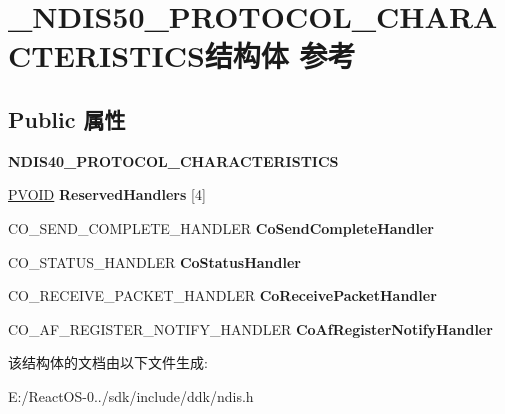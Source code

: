 \hypertarget{struct___n_d_i_s50___p_r_o_t_o_c_o_l___c_h_a_r_a_c_t_e_r_i_s_t_i_c_s}{}\section{\+\_\+\+N\+D\+I\+S50\+\_\+\+P\+R\+O\+T\+O\+C\+O\+L\+\_\+\+C\+H\+A\+R\+A\+C\+T\+E\+R\+I\+S\+T\+I\+C\+S结构体 参考}
\label{struct___n_d_i_s50___p_r_o_t_o_c_o_l___c_h_a_r_a_c_t_e_r_i_s_t_i_c_s}
\subsection*{Public 属性}
\begin{DoxyCompactItemize}
\item 
\mbox{\label{struct___n_d_i_s50___p_r_o_t_o_c_o_l___c_h_a_r_a_c_t_e_r_i_s_t_i_c_s_ae2b5d7f3e0739db87b4ff4bcdc73b37d}} 
{\bfseries N\+D\+I\+S40\+\_\+\+P\+R\+O\+T\+O\+C\+O\+L\+\_\+\+C\+H\+A\+R\+A\+C\+T\+E\+R\+I\+S\+T\+I\+CS}
\item 
\mbox{\label{struct___n_d_i_s50___p_r_o_t_o_c_o_l___c_h_a_r_a_c_t_e_r_i_s_t_i_c_s_ac73d350bc9578c972ff7a1dfa7f30ca0}} 
\hyperlink{interfacevoid}{P\+V\+O\+ID} {\bfseries Reserved\+Handlers} \mbox{[}4\mbox{]}
\item 
\mbox{\label{struct___n_d_i_s50___p_r_o_t_o_c_o_l___c_h_a_r_a_c_t_e_r_i_s_t_i_c_s_a9c76acb3f693580856566d1f3087b45b}} 
C\+O\+\_\+\+S\+E\+N\+D\+\_\+\+C\+O\+M\+P\+L\+E\+T\+E\+\_\+\+H\+A\+N\+D\+L\+ER {\bfseries Co\+Send\+Complete\+Handler}
\item 
\mbox{\label{struct___n_d_i_s50___p_r_o_t_o_c_o_l___c_h_a_r_a_c_t_e_r_i_s_t_i_c_s_a6026978b98c855ee8635cbd2902a7857}} 
C\+O\+\_\+\+S\+T\+A\+T\+U\+S\+\_\+\+H\+A\+N\+D\+L\+ER {\bfseries Co\+Status\+Handler}
\item 
\mbox{\label{struct___n_d_i_s50___p_r_o_t_o_c_o_l___c_h_a_r_a_c_t_e_r_i_s_t_i_c_s_a13b4614cd446dd82e0c90d6c6fb47abb}} 
C\+O\+\_\+\+R\+E\+C\+E\+I\+V\+E\+\_\+\+P\+A\+C\+K\+E\+T\+\_\+\+H\+A\+N\+D\+L\+ER {\bfseries Co\+Receive\+Packet\+Handler}
\item 
\mbox{\label{struct___n_d_i_s50___p_r_o_t_o_c_o_l___c_h_a_r_a_c_t_e_r_i_s_t_i_c_s_a6926c41b6ba0e8a1272e73673376713b}} 
C\+O\+\_\+\+A\+F\+\_\+\+R\+E\+G\+I\+S\+T\+E\+R\+\_\+\+N\+O\+T\+I\+F\+Y\+\_\+\+H\+A\+N\+D\+L\+ER {\bfseries Co\+Af\+Register\+Notify\+Handler}
\end{DoxyCompactItemize}


该结构体的文档由以下文件生成\+:\begin{DoxyCompactItemize}
\item 
E\+:/\+React\+O\+S-\/0../sdk/include/ddk/ndis.\+h\end{DoxyCompactItemize}
